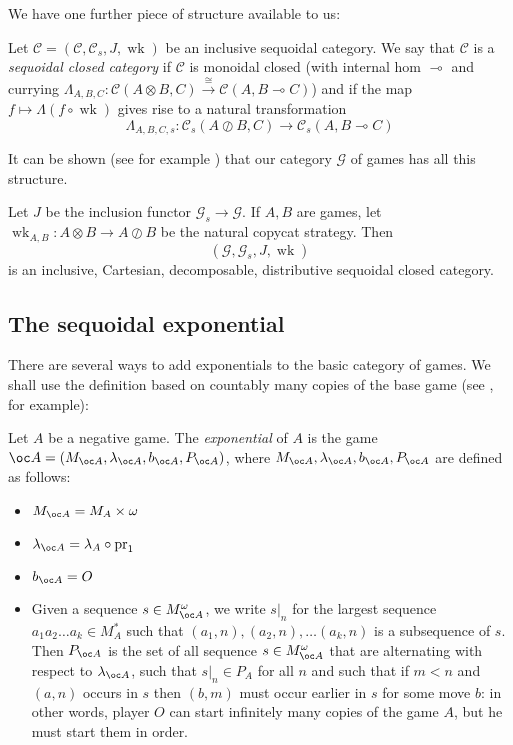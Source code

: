 \documentclass[a4paper,UKenglish]{lipics-v2016}
\theoremstyle{plain}
\theoremstyle{definition}
\newcommand*\from{\colon}
\DeclareMathOperator{\pr}{pr}
\newcommand{\tensor}{\otimes}
\newcommand{\sequoid}{\oslash}
\renewcommand{\implies}{\multimap}
\newcommand{\comp}[2]{#1 \circ #2}
\newcommand{\C}{\mathcal C}
\newcommand{\G}{\mathcal G}
\DeclareMathOperator{\wk}{wk}
\newcommand{\toisom}{{\xrightarrow{\cong}}}
\newlength{\arrow}
\begin{document}
We have one further piece of structure available to us:

\begin{definition}
  Let $\C=(\C,\C_s,J,\wk)$ be an inclusive sequoidal category.  We say that $\C$ is a \emph{sequoidal closed category} if $\C$ is monoidal closed (with internal hom $\implies$ and currying $\Lambda_{A,B,C}\from \C(A\tensor B,C)\toisom \C(A,B\implies C)$) and if the map $f\mapsto\Lambda(\comp{f}{\wk})$ gives rise to a natural transformation
  \[
    \Lambda_{A,B,C,s}\from \C_s(A\sequoid B, C) \to \C_s(A,B\implies C)
    \]
\end{definition}

It can be shown (see for example \cite{martinsthesis}) that our category $\G$ of games has all this structure.

\begin{theorem}
  Let $J$ be the inclusion functor $\G_s\to\G$.  If $A,B$ are games, let $\wk_{A,B}\from A\tensor B\to A\sequoid B$ be the natural copycat strategy.  Then
  \[
    (\G,\G_s,J,\wk)
    \]
  is an inclusive, Cartesian, decomposable, distributive sequoidal closed category.
\end{theorem}

\subsection{The sequoidal exponential}

There are several ways to add exponentials to the basic category of games.  We shall use the definition based on countably many copies of the base game (see \cite{laird02}, for example):

\begin{definition}
  Let $A$ be a negative game.  The \emph{exponential} of $A$ is the game $\oc A = (M_{\oc A}, \lambda_{\oc A}, b_{\oc A}, P_{\oc A})$, where $M_{\oc A}, \lambda_{\oc A}, b_{\oc A}, P_{\oc A}$ are defined as follows:
  \begin{itemize}
    \item $M_{\oc A} = M_A \times \omega$
    \item $\lambda_{\oc A} = \lambda_A \circ \pr_1$
    \item $b_{\oc A} = O$
    \item Given a sequence $s\in M_{\oc A}^\omega$, we write $s\vert_n$ for the largest sequence $a_1a_2\dots a_k\in M_A^*$ such that $(a_1,n),(a_2,n),\dots(a_k,n)$ is a subsequence of $s$.  Then $P_{\oc A}$ is the set of all sequence $s\in M_{\oc A}^\omega$ that are alternating with respect to $\lambda_{\oc A}$, such that $s\vert_n\in P_A$ for all $n$ and such that if $m<n$ and $(a,n)$ occurs in $s$ then $(b,m)$ must occur earlier in $s$ for some move $b$: in other words, player $O$ can start infinitely many copies of the game $A$, but he must start them in order.
  \end{itemize}
\end{definition}
\end{document}
